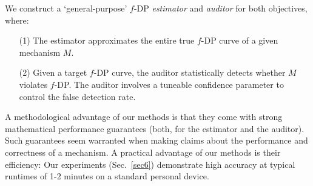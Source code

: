 We construct a `general-purpose' $f$-DP {\em estimator} and {\em auditor} for both objectives, where:\\[-3.5ex]
\begin{itemize}
        \item[(1)] The estimator approximates the entire true \(f\)-DP curve of a given mechanism $M$. \\[-3.5ex]
        \item[(2)] Given a target \(f\)-DP curve, the auditor statistically detects whether $M$ violates $f$-DP.  The auditor involves a tuneable confidence parameter to control the false detection rate. \\[-3.5ex]
\end{itemize}
A methodological advantage of our methods is that they come with strong mathematical performance guarantees (both, for the estimator and the auditor). Such guarantees seem warranted when making claims about the performance and correctness of a mechanism. A practical advantage of our methods is their efficiency: Our experiments (Sec.~\ref{sec6}) demonstrate high accuracy at typical runtimes of 1-2 minutes on a standard personal device.


